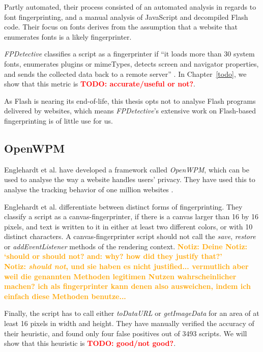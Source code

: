 \documentclass[
    fontsize=12pt,
    headings=small,
    parskip=half,
    bibliography=totoc,
    numbers=noenddot,
    open=any
    ]{scrreprt}
\newcommand{\dominik}[1]{\textcolor{orange}{\textbf{Notiz: #1}}}
\newcommand{\todo}[1]{\textcolor{red}{\textbf{TODO: #1}}}
\begin{document}
Partly automated, their process consisted of an automated analysis in regards to font fingerprinting,
and a manual analysis of JavaScript and decompiled Flash code.
Their focus on fonts derives from the assumption that a website that
enumerates fonts is a likely fingerprinter.

\textit{FPDetective} classifies a script as a fingerprinter if ``it loads more than 30 system fonts, enumerates plugins
or mimeTypes, detects screen and navigator properties, and sends the collected data back to a remote server''
\cite{DBLP:conf/ccs/AcarJNDGPP13}.
In Chapter~\ref{todo}, we show that this metric is \todo{accurate/useful or not?}.

As Flash is nearing its end-of-life, this thesis opts not to analyse Flash programs
delivered by websites, which means \textit{FPDetective}'s extensive work on Flash-based fingerprinting
is of little use for us.


\subsection{OpenWPM}
\label{section:openwpm}
Englehardt et al. have developed a framework called \textit{OpenWPM}, which can be used to analyse the way a website
handles users' privacy. They have used this to analyse the tracking behavior of one million websites
\cite{DBLP:conf/ccs/EnglehardtN16,englehardt2016census}.

Englehardt et al. differentiate between distinct forms of fingerprinting.
They classify a script as a canvas-fingerprinter, if there is a canvas larger than 16 by 16 pixels, and text is
written to it in either at least two different colors, or with 10 distinct characters.
A canvas-fingerprinter script should not call the \textit{save}, \textit{restore} or \textit{addEventListener}
methods of the rendering context.
\dominik{Deine Notiz: `should or should not? and: why? how did they justify that?'}\\
\dominik{\textit{should not}, und sie haben es nicht justified... vermutlich aber weil die genannten Methoden legitimen Nutzen wahrscheinlicher machen? ich als fingerprinter kann denen also ausweichen, indem ich einfach diese Methoden benutze...}

Finally, the script has to call either \textit{toDataURL}
or \textit{getImageData} for an area of at least 16 pixels in width and height.
They have manually verified the accuracy of their heuristic, and found only four false positives
out of 3493 scripts.
We will show that this heuristic is \todo{good/not good?}.
\end{document}
